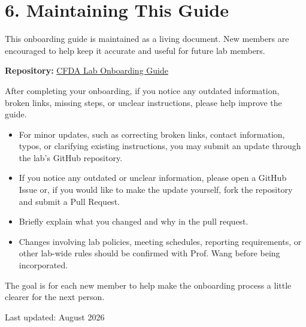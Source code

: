 \documentclass[10pt]{article}
\begin{document}
\section{6. Maintaining This Guide}

This onboarding guide is maintained as a living document. New members are encouraged to help keep it accurate and useful for future lab members.

\textbf{Repository:}
\href{https://github.com/jerewang/CFDA-Lab-Onboarding}{CFDA Lab Onboarding Guide}

After completing your onboarding, if you notice any outdated information, broken links, missing steps, or unclear instructions, please help improve the guide.

\begin{itemize}
  \item For minor updates, such as correcting broken links, contact information, typos, or clarifying existing instructions, you may submit an update through the lab's GitHub repository.

  \item
      If you notice any outdated or unclear information, please open a GitHub Issue or, if you would like to make the update yourself, fork the repository and submit a Pull Request.

  \item Briefly explain what you changed and why in the pull request.

  \item Changes involving lab policies, meeting schedules, reporting requirements, or other lab-wide rules should be confirmed with Prof. Wang before being incorporated.
\end{itemize}

The goal is for each new member to help make the onboarding process a little clearer for the next person.

\vfill
{\small\color{LabMuted}Last updated: August 2026}
\end{document}
